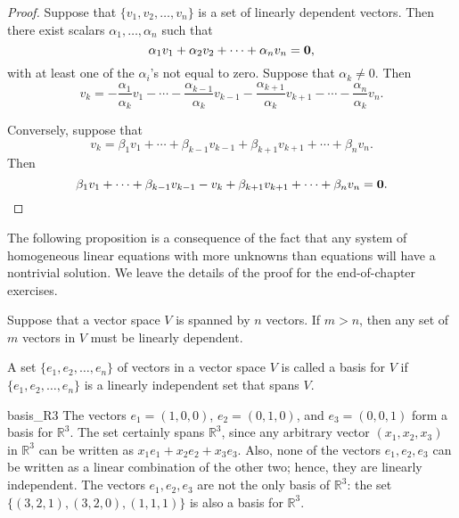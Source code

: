 \begin{proof}
Suppose that $\{ v_1, v_2, \dots, v_n \}$ is a set of linearly dependent
vectors.  Then there exist scalars $\alpha_1, \ldots, \alpha_n$
such that
\[
\alpha_1 v_1 + \alpha_2 v_2 + \cdots + \alpha_n v_n = {\bold 0 },
\]
with at least one of the $\alpha_i$'s not equal to zero.  Suppose that
$\alpha_k \neq 0$. Then 
\[
v_k = - \frac{\alpha_1}{\alpha_k} v_1 
- \cdots 
- \frac{\alpha_{k-1}}{\alpha_k}	v_{k-1}
- \frac{\alpha_{k+1}}{\alpha_k}	v_{k+1}
- \cdots 
- \frac{\alpha_n}{\alpha_k} v_n.
\]


Conversely, suppose that 
\[
v_k = \beta_1 v_1 
+ \cdots 
+ \beta_{k-1} v_{k-1}
+ \beta_{k+1} v_{k+1}
+ \cdots 
+ \beta_n v_n.
\]
Then
\[
\beta_1 v_1 
+ \cdots 
+ \beta_{k-1} v_{k-1}
- v_k
+ \beta_{k+1} v_{k+1}
+ \cdots 
+ \beta_n v_n = {\bold 0}.
\]
\end{proof}

\medskip


The following proposition is a consequence of the fact that any system
of homogeneous linear equations with more unknowns than equations will
have a nontrivial solution.  We leave the details of the proof for the
end-of-chapter exercises. 
 

\begin{proposition}
Suppose that a vector space $V$ is spanned by $n$ vectors. If $m > n$,
then any set of $m$ vectors in $V$ must be linearly dependent. 
\end{proposition}
 
  
A set $\{ e_1, e_2, \ldots, e_n \}$ of vectors in a vector space $V$
is called a {\bfi basis\/} for $V$ if $\{
e_1, e_2, \ldots, e_n \}$ is a linearly independent set that spans
$V$.

 
 
\begin{example}{basis_R3}
The vectors $e_1 = (1, 0, 0)$, $e_2 = (0, 1, 0)$, and $e_3 =(0, 0, 1)$
form a basis for ${\mathbb R}^3$.  The set certainly spans ${\mathbb R}^3$,
since any arbitrary vector $(x_1, x_2, x_3)$ in ${\mathbb R}^3$ can be
written as $x_1 e_1 + x_2 e_2 + x_3 e_3$. Also, none of the vectors
$e_1, e_2, e_3$ can be written as a linear combination of the other
two; hence, they are linearly independent.  The vectors $e_1, e_2,
e_3$ are not the only basis of ${\mathbb R}^3$:  the set $\{ (3, 2, 1),
(3, 2, 0), (1, 1, 1) \}$ is also a basis for ${\mathbb R}^3$. 
\end{example}

 
 
